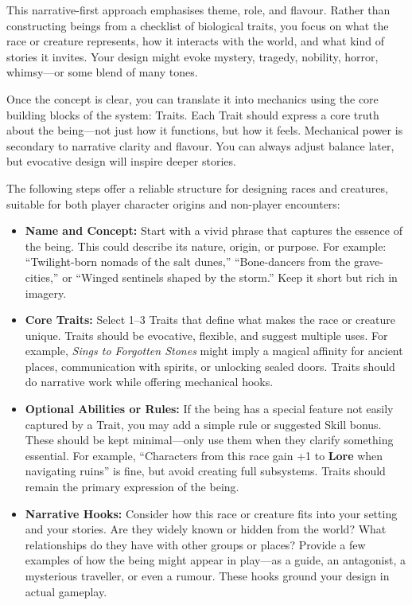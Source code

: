 This narrative-first approach emphasises theme, role, and flavour. Rather than constructing beings from a checklist of biological traits, you focus on what the race or creature represents, how it interacts with the world, and what kind of stories it invites. Your design might evoke mystery, tragedy, nobility, horror, whimsy—or some blend of many tones.

Once the concept is clear, you can translate it into mechanics using the core building blocks of the system: Traits. Each Trait should express a core truth about the being—not just how it functions, but how it feels. Mechanical power is secondary to narrative clarity and flavour. You can always adjust balance later, but evocative design will inspire deeper stories.

The following steps offer a reliable structure for designing races and creatures, suitable for both player character origins and non-player encounters:

\begin{itemize}
  \item \textbf{Name and Concept:} Start with a vivid phrase that captures the essence of the being. This could describe its nature, origin, or purpose. For example: ``Twilight-born nomads of the salt dunes,'' ``Bone-dancers from the grave-cities,'' or ``Winged sentinels shaped by the storm.'' Keep it short but rich in imagery.

  \item \textbf{Core Traits:} Select 1–3 Traits that define what makes the race or creature unique. Traits should be evocative, flexible, and suggest multiple uses. For example, \emph{Sings to Forgotten Stones} might imply a magical affinity for ancient places, communication with spirits, or unlocking sealed doors. Traits should do narrative work while offering mechanical hooks.

  \item \textbf{Optional Abilities or Rules:} If the being has a special feature not easily captured by a Trait, you may add a simple rule or suggested Skill bonus. These should be kept minimal—only use them when they clarify something essential. For example, ``Characters from this race gain +1 to \textbf{Lore} when navigating ruins'' is fine, but avoid creating full subsystems. Traits should remain the primary expression of the being.

  \item \textbf{Narrative Hooks:} Consider how this race or creature fits into your setting and your stories. Are they widely known or hidden from the world? What relationships do they have with other groups or places? Provide a few examples of how the being might appear in play—as a guide, an antagonist, a mysterious traveller, or even a rumour. These hooks ground your design in actual gameplay.
\end{itemize}

